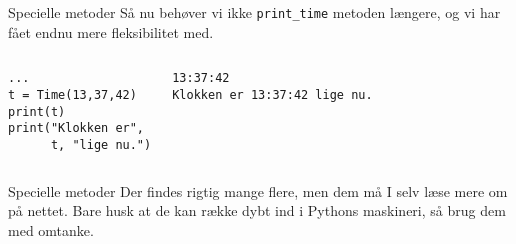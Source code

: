 \documentclass[main.tex]{subfiles}
\begin{document}
\begin{frame}[fragile]{Specielle metoder}
Så nu behøver vi ikke \texttt{print\_time} metoden længere, og vi har fået endnu mere fleksibilitet med.
\begin{columns}
\begin{lstlisting}[style=python]
...
t = Time(13,37,42)
print(t)
print("Klokken er", 
      t, "lige nu.")
\end{lstlisting}
\pause
{}
\begin{lstlisting}[style=python]
13:37:42
Klokken er 13:37:42 lige nu.
\end{lstlisting}
\end{columns}
\end{frame}

\begin{frame}[fragile]{Specielle metoder}
Der findes rigtig mange flere, men dem må I selv læse mere om på nettet. Bare husk at de kan række dybt ind i Pythons maskineri, så brug dem med omtanke.
\end{frame}
%
%
\end{document}
